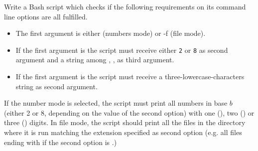
    Write a Bash script which checks if the following requirements on its command line options are all fulfilled.
    \begin{itemize}
        \item The first argument is  either  (numbers mode) or {-f} (file mode).
        \item If the first argument is  the script must receive either \texttt{2} or \texttt{8} as second argument and a string among , ,  as third argument.
        \item If the first argument is  the script must receive a three-lowercase-characters string as second argument.
    \end{itemize}
    If the number mode is selected, the script must print all numbers in base $b$ (either 2 or 8, depending on the value of the second option) with one (), two () or three () digits.
    In file mode, the script should print all the files in the directory where it is run matching the extension specified as second option (e.g. all files ending with  if the second option is .)
\EndExercise[DodgerBlue]